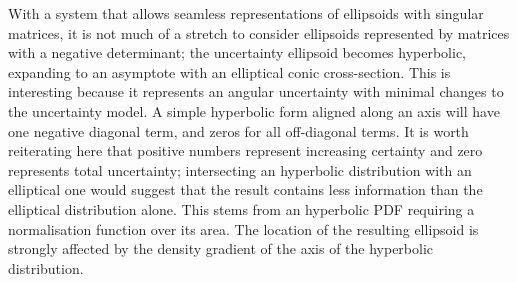 \documentclass[a4paper, 11pt, titlepage]{article}
\newcounter{subsubsubsection}[subsubsection]
\begin{document}
        \label{sec:hyperbolicCase}
        With a system that allows seamless representations of ellipsoids with singular matrices, it is not much of a stretch to consider ellipsoids represented by matrices with a negative determinant; the uncertainty ellipsoid becomes hyperbolic, expanding to an asymptote with an elliptical conic cross-section.  This is interesting because it represents an angular uncertainty with minimal changes to the uncertainty model.
        A simple hyperbolic form aligned along an axis will have one negative diagonal term, and zeros for all off-diagonal terms.
        It is worth reiterating here that positive numbers represent increasing certainty and zero represents total uncertainty; intersecting an hyperbolic distribution with an elliptical one would suggest that the result contains less information than the elliptical distribution alone.
        This stems from an hyperbolic PDF requiring a normalisation function over its area.  The location of the resulting ellipsoid is strongly affected by the density gradient of the axis of the hyperbolic distribution.
\end{document}
